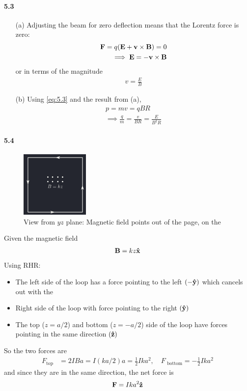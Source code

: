 \documentclass[../main.tex]{subfiles}
\begin{document}
\paragraph{5.3}
\begin{enumerate}
    \item [(a)] Adjusting the beam for zero deflection means that the Lorentz force is zero:
    \begin{align*}
        \vb F = q(\vb E + \vb v \times \vb B) = 0 \\
        \implies \vb E = -\vb v \times \vb B
    \end{align*}
    or in terms of the magnitude 
    \begin{align*}
        \boxed{
            v = \frac{E}{B}
        }
    \end{align*}
    \item [(b)] Using \ref{eq:5.3} and the result from (a),
    \begin{align*}
        p = mv = qBR \\
        \implies \frac{q}{m} = \frac{v}{BR} = \boxed{\frac{E}{B^2R}}
    \end{align*}
\end{enumerate}

\newpage
\paragraph{5.4} 
\begin{figure}[ht]
    \centering
    \includegraphics[width=0.3\textwidth]{hw8_2.png}
    \caption{View from $yz$ plane: Magnetic field points out of the page, on the}
    \label{fig:hw8_2}
\end{figure}
Given the magnetic field
\begin{align*}
    \vb B = kz \vu x
\end{align*}
Using RHR:
\begin{itemize}
    \item The left side of the loop has a force pointing to the left $(-\vu y)$ which cancels out with the 
    \item Right side of the loop with force pointing to the right $(\vu y)$
    \item The top ($z = a/2$) and bottom ($z = -a/2$) side of the loop have forces pointing in the same direction $(\vu z)$
\end{itemize}
So the two forces are
\begin{align*}
    F_\text{top} &= 2 I Ba = I (k a/2) a = \frac{1}{2} I k a^2, \quad F_\text{ bottom} = -\frac{1}{2} I k a^2
\end{align*}
and since they are in the same direction, the net force is
\begin{align*}
    \vb F = I k a^2 \vu z
\end{align*}
\end{document}
